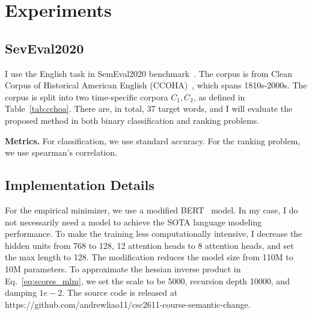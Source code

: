 
\section{Experiments}

\subsection{SevEval2020}

I use the English task in SemEval2020 benchmark~\cite{semeval2020}.
The corpus is from Clean Corpus of Historical American English (CCOHA)~\cite{ccoha1,ccoha2}, which spans 1810s-2000s.
The corpus is split into two time-specific corpora $C_1, C_2$, as defined in Table~\ref{tab:cchoa}.
There are, in total, 37 target words, and I will evaluate the proposed method in both binary classification and ranking problems.



\noindent\textbf{Metrics.} 
For classification, we use standard accuracy. For the ranking problem, we use spearman's correlation.

\begin{table}[th]
\centering
{}
\caption{Statistics of test corpora. TTR = Type-Token ratio (number of types / number of tokens * 1000)}
\label{tab:cchoa}
\end{table}


\subsection{Implementation Details}\label{sec:impl_details}
For the empirical minimizer, we use a modified BERT~\cite{BERT} model.
In my case, I do not necessarily need a model to achieve the SOTA language modeling performance. 
To make the training less computationally intensive, I decrease the hidden units from 768 to 128, 12 attention heads to 8 attention heads, and set the max length to 128.
The modification reduces the model size from 110M to 10M parameters.
To approximate the hessian inverse product in Eq.~\ref{eq:scores_mlm}, we set the scale to be 5000, recursion depth 10000, and damping $1e-2$.
The source code is released at https://github.com/andrewliao11/csc2611-course-semantic-change.



